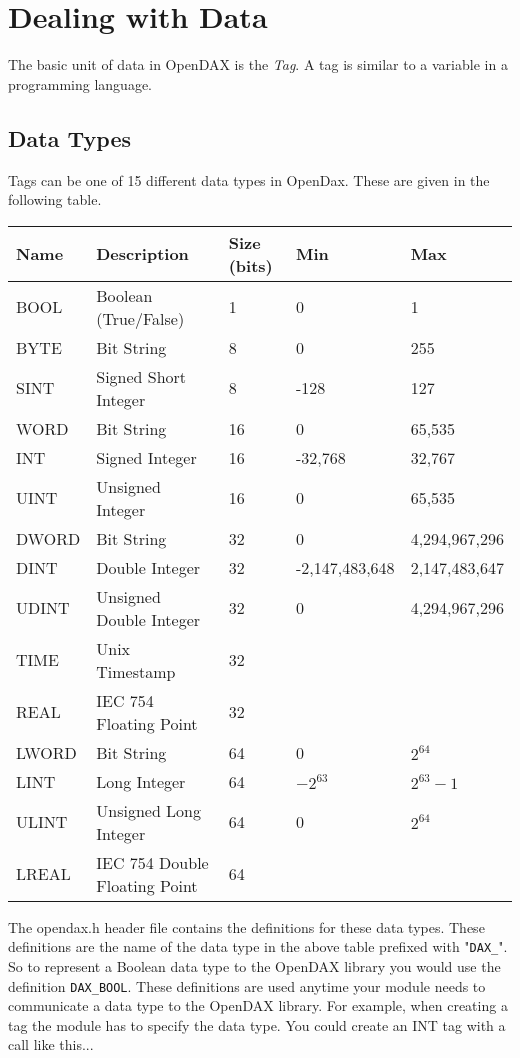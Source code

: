 \chapter{Dealing with Data}
The basic unit of data in OpenDAX is the \textit{Tag}.  A tag is similar to a variable in a programming language.
\section{Data Types}
Tags can be one of 15 different data types in OpenDax.  These are given in the following table.

\begin{tabular}{|l|l|l|l|l|}
\hline \textbf{Name} & \textbf{Description} & \textbf{Size (bits)} & \textbf{Min} & \textbf{Max} \\
\hline BOOL & Boolean (True/False) & 1 & 0 & 1 \\
\hline BYTE & Bit String & 8 & 0 & 255 \\
\hline SINT & Signed Short Integer & 8 & -128 & 127 \\
\hline WORD & Bit String & 16 & 0 & 65,535 \\
\hline INT & Signed Integer & 16 & -32,768 & 32,767 \\
\hline UINT & Unsigned Integer & 16 & 0 & 65,535 \\
\hline DWORD & Bit String & 32 & 0 & 4,294,967,296 \\
\hline DINT & Double Integer & 32 & -2,147,483,648 & 2,147,483,647 \\
\hline UDINT & Unsigned Double Integer & 32 & 0 & 4,294,967,296 \\
\hline TIME & Unix Timestamp & 32 &  &  \\
\hline REAL & IEC 754 Floating Point & 32 &  &  \\
\hline LWORD & Bit String & 64 & 0 & $2^{64}$ \\
\hline LINT & Long Integer & 64 & $-2^{63}$ & $2^{63}-1$ \\
\hline ULINT & Unsigned Long Integer & 64 & 0 & $2^{64}$ \\
\hline LREAL & IEC 754 Double Floating Point & 64 &  &  \\
\hline 
\end{tabular}
 
The opendax.h header file contains the definitions for these data types.  These definitions are the name of the data type in the above table prefixed with "\texttt{DAX\_}".  So to represent a Boolean data type to the OpenDAX library you would use the definition \texttt{DAX\_BOOL}.  These definitions are used anytime your module needs to communicate a data type to the OpenDAX library.  For example, when creating a tag the module has to specify the data type.  You could create an INT tag with a call like this...

